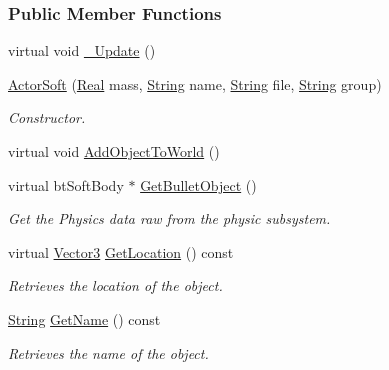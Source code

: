 \subsubsection*{Public Member Functions}
\begin{DoxyCompactItemize}
\item 
virtual void \hyperlink{classMezzanine_1_1ActorSoft_a1f255e52f48a9fec2cfe2f91664fb350}{\_\-Update} ()
\item 
\hyperlink{classMezzanine_1_1ActorSoft_a3ab7c4cb45c0308a1b398069095d81b2}{ActorSoft} (\hyperlink{namespaceMezzanine_a726731b1a7df72bf3583e4a97282c6f6}{Real} mass, \hyperlink{namespaceMezzanine_acf9fcc130e6ebf08e3d8491aebcf1c86}{String} name, \hyperlink{namespaceMezzanine_acf9fcc130e6ebf08e3d8491aebcf1c86}{String} file, \hyperlink{namespaceMezzanine_acf9fcc130e6ebf08e3d8491aebcf1c86}{String} group)
\begin{DoxyCompactList}\small\item\em Constructor. \item\end{DoxyCompactList}\item 
virtual void \hyperlink{classMezzanine_1_1ActorSoft_a22e089e98fe83eeb379d399945a10fe9}{AddObjectToWorld} ()
\item 
virtual btSoftBody $\ast$ \hyperlink{classMezzanine_1_1ActorSoft_ab0ddf931ccde766dc5e040077f1a3ec4}{GetBulletObject} ()
\begin{DoxyCompactList}\small\item\em Get the Physics data raw from the physic subsystem. \item\end{DoxyCompactList}\item 
virtual \hyperlink{classMezzanine_1_1Vector3}{Vector3} \hyperlink{classMezzanine_1_1ActorSoft_a0192b3889eaf2786352d75ca03fcae4a}{GetLocation} () const 
\begin{DoxyCompactList}\small\item\em Retrieves the location of the object. \item\end{DoxyCompactList}\item 
\hyperlink{namespaceMezzanine_acf9fcc130e6ebf08e3d8491aebcf1c86}{String} \hyperlink{classMezzanine_1_1ActorSoft_a733138429fccf93f626e44ee9056e102}{GetName} () const 
\begin{DoxyCompactList}\small\item\em Retrieves the name of the object. \item\end{DoxyCompactList}\item 

\end{DoxyCompactItemize}
